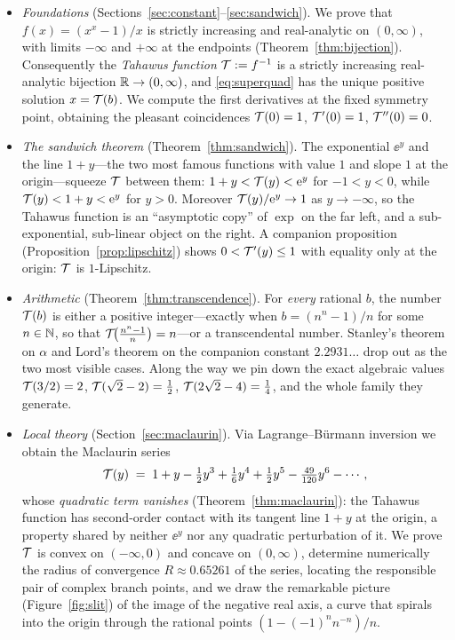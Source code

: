 \begin{itemize}[leftmargin=1.6em]

\item \emph{Foundations} (Sections~\ref{sec:constant}--\ref{sec:sandwich}).
We prove that $f(x) = (x^{x}-1)/x$ is strictly increasing and
real-analytic on $(0,\infty)$, with limits $-\infty$ and $+\infty$ at the
endpoints (Theorem~\ref{thm:bijection}). Consequently the
\emph{Tahawus function} $\mathcal{T} := f^{-1}$ is a strictly increasing
real-analytic bijection $\mathbb{R} \to (0,\infty)$, and \eqref{eq:superquad} has
the unique positive solution $x = \mathcal{T}(b)$. We compute the first
derivatives at the fixed symmetry point, obtaining the pleasant
coincidences $\mathcal{T}(0) = 1$, $\mathcal{T}'(0) = 1$, $\mathcal{T}''(0) = 0$.

\item \emph{The sandwich theorem} (Theorem~\ref{thm:sandwich}). The
exponential $\ee^{y}$ and the line $1+y$---the two most famous
functions with value $1$ and slope $1$ at the origin---squeeze
$\mathcal{T}$ between them: $1 + y < \mathcal{T}(y) < \mathrm{e}^{y}$ for $-1 < y < 0$, while
$\mathcal{T}(y) < 1 + y < \mathrm{e}^{y}$ for $y > 0$. Moreover $\mathcal{T}(y)/\mathrm{e}^{y} \to 1$
as $y \to -\infty$, so the Tahawus function is an ``asymptotic copy'' of
$\exp$ on the far left, and a sub-exponential, sub-linear object on the
right. A companion proposition (Proposition~\ref{prop:lipschitz}) shows
$0 < \mathcal{T}'(y) \le 1$ with equality only at the origin: $\mathcal{T}$ is
$1$-Lipschitz.

\item \emph{Arithmetic} (Theorem~\ref{thm:transcendence}). For
\emph{every} rational $b$, the number $\mathcal{T}(b)$ is either a positive
integer---exactly when $b = (n^{n}-1)/n$ for some $n \in \mathbb{N}$, so that
$\mathcal{T}\!\big(\tfrac{n^{n}-1}{n}\big) = n$---or a transcendental number.
Stanley's theorem on $\alpha$ and Lord's theorem on the companion
constant $2.2931\ldots$ \cite{lord} drop out as the two most visible
cases. Along the way we pin down the exact algebraic values
$\mathcal{T}(3/2) = 2$, $\mathcal{T}(\sqrt2 - 2) = \tfrac12$, $\mathcal{T}(2\sqrt2 - 4) =
\tfrac14$, and the whole family they generate.

\item \emph{Local theory} (Section~\ref{sec:maclaurin}). Via
Lagrange--B\"urmann inversion we obtain the Maclaurin series
\[
    \mathcal{T}(y) \;=\; 1 + y - \tfrac{1}{2}y^{3} + \tfrac{1}{6}y^{4}
    + \tfrac{1}{2}y^{5} - \tfrac{49}{120}y^{6} - \cdots ,
\]
whose \emph{quadratic term vanishes} (Theorem~\ref{thm:maclaurin}): the
Tahawus function has second-order contact with its tangent line $1+y$ at
the origin, a property shared by neither $\ee^{y}$ nor any quadratic
perturbation of it. We prove $\mathcal{T}$ is convex on $(-\infty, 0)$ and
concave on $(0,\infty)$, determine numerically the radius of convergence
$R \approx 0.65261$ of the series, locating the responsible pair of
complex branch points, and we draw the remarkable picture
(Figure~\ref{fig:slit}) of the image of the negative real axis, a curve
that spirals into the origin through the rational points
$(1 - (-1)^{n}n^{-n})/n$.


\end{itemize}
